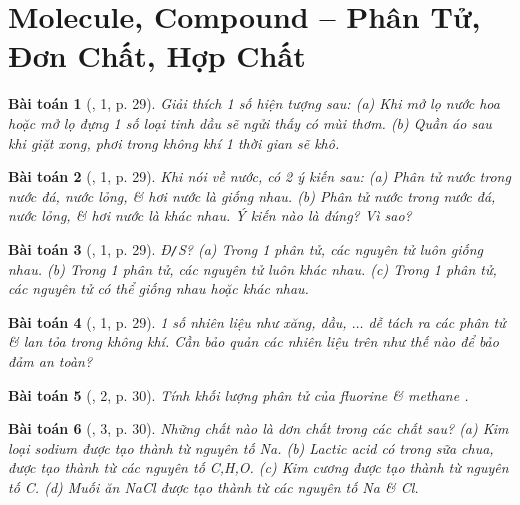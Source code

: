 \documentclass{article}
\newtheorem{baitoan}{Bài toán}
\begin{document}

\section{Molecule, Compound -- Phân Tử, Đơn Chất, Hợp Chất}

\begin{baitoan}[\cite{SGK_KHTN_7_Canh_Dieu}, 1, p. 29]
	Giải thích 1 số hiện tượng sau: (a) Khi mở lọ nước hoa hoặc mở lọ đựng 1 số loại tinh dầu sẽ ngửi thấy có mùi thơm. (b) Quần áo sau khi giặt xong, phơi trong không khí 1 thời gian sẽ khô.
\end{baitoan}

\begin{baitoan}[\cite{SGK_KHTN_7_Canh_Dieu}, 1, p. 29]
	Khi nói về nước, có 2 ý kiến sau: (a) Phân tử nước trong nước đá, nước lỏng, \& hơi nước là giống nhau. (b) Phân tử nước trong nước đá, nước lỏng, \& hơi nước là khác nhau. Ý kiến nào là đúng? Vì sao?
\end{baitoan}

\begin{baitoan}[\cite{SGK_KHTN_7_Canh_Dieu}, 1, p. 29]
	\emph{Đ\texttt{/}S?} (a) Trong 1 phân tử, các nguyên tử luôn giống nhau. (b) Trong 1 phân tử, các nguyên tử luôn khác nhau. (c) Trong 1 phân tử, các nguyên tử có thể giống nhau hoặc khác nhau.
\end{baitoan}

\begin{baitoan}[\cite{SGK_KHTN_7_Canh_Dieu}, 1, p. 29]
	1 số nhiên liệu như xăng, dầu, $\ldots$ dễ tách ra các phân tử \& lan tỏa trong không khí. Cần bảo quản các nhiên liệu trên như thế nào để bảo đảm an toàn?
\end{baitoan}

\begin{baitoan}[\cite{SGK_KHTN_7_Canh_Dieu}, 2, p. 30]
	Tính khối lượng phân tử của fluorine \emph{} \& methane \emph{}.
\end{baitoan}

\begin{baitoan}[\cite{SGK_KHTN_7_Canh_Dieu}, 3, p. 30]
	Những chất nào là dơn chất trong các chất sau? (a) Kim loại sodium được tạo thành từ nguyên tố \emph{Na}. (b) Lactic acid có trong sữa chua, được tạo thành từ các nguyên tố \emph{C,H,O}. (c) Kim cương được tạo thành từ nguyên tố \emph{C}. (d) Muối ăn \emph{NaCl} được tạo thành từ các nguyên tố \emph{Na} \& \emph{Cl}.
\end{baitoan}
\end{document}
